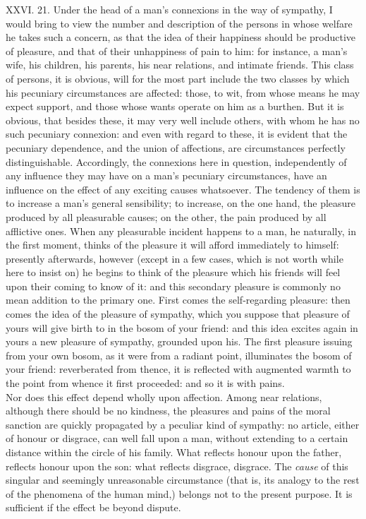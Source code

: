\documentclass[12pt]{report}
\begin{document}
XXVI. 21. Under the head of a man's connexions in the way of sympathy, I
would bring to view the number and description of the persons in whose
welfare he takes such a concern, as that the idea of their happiness
should be productive of pleasure, and that of their unhappiness of pain
to him: for instance, a man's wife, his children, his parents, his near
relations, and intimate friends. This class of persons, it is obvious,
will for the most part include the two classes by which his pecuniary
circumstances are affected: those, to wit, from whose means he may
expect support, and those whose wants operate on him as a burthen. But
it is obvious, that besides these, it may very well include others, with
whom he has no such pecuniary connexion: and even with regard to these,
it is evident that the pecuniary dependence, and the union of
affections, are circumstances perfectly distinguishable. Accordingly,
the connexions here in question, independently of any influence they may
have on a man's pecuniary circumstances, have an influence on the effect
of any exciting causes whatsoever. The tendency of them is to increase a
man's general sensibility; to increase, on the one hand, the pleasure
produced by all pleasurable causes; on the other, the pain produced by
all afflictive ones. When any pleasurable incident happens to a man, he
naturally, in the first moment, thinks of the pleasure it will afford
immediately to himself: presently afterwards, however (except in a few
cases, which is not worth while here to insist on) he begins to think of
the pleasure which his friends will feel upon their coming to know of
it: and this secondary pleasure is commonly no mean addition to the
primary one. First comes the self-regarding pleasure: then comes the
idea of the pleasure of sympathy, which you suppose that pleasure of
yours will give birth to in the bosom of your friend: and this idea
excites again in yours a new pleasure of sympathy, grounded upon his.
The first pleasure issuing from your own bosom, as it were from a
radiant point, illuminates the bosom of your friend: reverberated from
thence, it is reflected with augmented warmth to the point from whence
it first proceeded: and so it is with pains.\\
Nor does this effect depend wholly upon affection. Among near relations,
although there should be no kindness, the pleasures and pains of the
moral sanction are quickly propagated by a peculiar kind of sympathy: no
article, either of honour or disgrace, can well fall upon a man, without
extending to a certain distance within the circle of his family. What
reflects honour upon the father, reflects honour upon the son: what
reflects disgrace, disgrace. The \emph{cause} of this singular and
seemingly unreasonable circumstance (that is, its analogy to the rest of
the phenomena of the human mind,) belongs not to the present purpose. It
is sufficient if the effect be beyond dispute.
\end{document}
